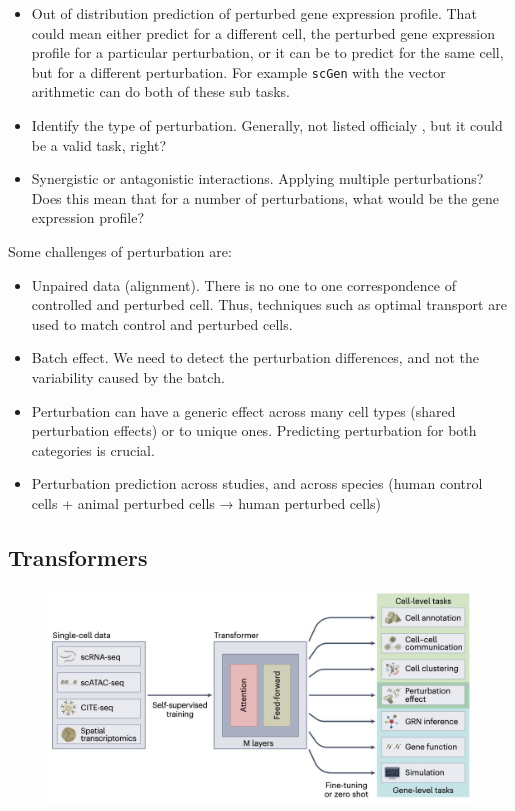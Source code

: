 \documentclass[12pt, a4paper]{article}
\begin{document}
\begin{itemize}
  \itemsep -0.1em
  \item Out of distribution prediction of perturbed gene expression profile. That could mean either predict for a different cell, the perturbed gene expression profile for a particular perturbation, or it can be to predict for the same cell, but for a different perturbation. For example \verb|scGen| \cite{lotfollahiScGenPredictsSinglecell2019} with the vector arithmetic can do both of these sub tasks.
  \item Identify the type of perturbation. Generally, not listed officialy \cite{gavriilidisMinireviewPerturbationModelling2024}, but it could be a valid task, right?
  \item Synergistic or antagonistic interactions. Applying multiple perturbations? Does this mean that for a number of perturbations, what would be the gene expression profile?
\end{itemize}

Some challenges of perturbation are:

\begin{itemize}
  \itemsep -0.1em
  \item Unpaired data (alignment). There is no one to one correspondence of controlled and perturbed cell. Thus, techniques such as optimal transport are used to match control and perturbed cells.
  \item Batch effect. We need to detect the perturbation differences, and not the variability caused by the batch.
  \item Perturbation can have a generic effect across many cell types (shared perturbation effects) or to unique ones. Predicting perturbation for both categories is crucial.
  \item Perturbation prediction across studies, and across species (human control cells + animal perturbed cells → human perturbed cells)
\end{itemize}

\clearpage

\subsection{Transformers}
\label{sec:transformers}

\begin{figure}[h!]
  \centering
  \includegraphics[width=\textwidth]{tranformers_single_cell.jpg}
  \caption{\cite{szalataTransformersSinglecellOmics2024}}
\end{figure}
\end{document}

